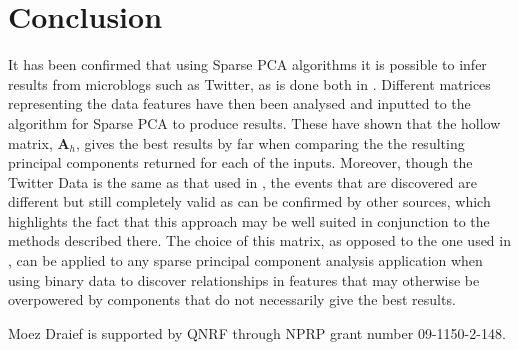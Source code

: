 \documentclass[graybox]{svmult}
\newcommand{\covmat}{\mathbf{A}}
\begin{document}
\section{Conclusion}\label{conclusion}

It has been confirmed that using Sparse PCA algorithms it is possible to infer results from microblogs such as Twitter, as is done both in \cite{dimakis}. Different matrices representing the data features have then been analysed and inputted to the algorithm for Sparse PCA to produce results. These have shown that the hollow matrix, $\covmat_h$, gives the best results by far when comparing the the resulting principal components returned for each of the inputs. Moreover, though the Twitter Data is the same as that used in \cite{microblogs}, the events that are discovered are different but still completely valid as can be confirmed by other sources, which highlights the fact that this approach may be well suited in conjunction to the methods described there. The choice of this matrix, as opposed to the one used in \cite{dimakis}, can be applied to any sparse principal component analysis application when using binary data to discover relationships in features that may otherwise be overpowered by components that do not necessarily give the best results. 

\acknowledgement

Moez Draief is supported by QNRF through NPRP grant number 09-1150-2-148. 




{}
\end{document}
